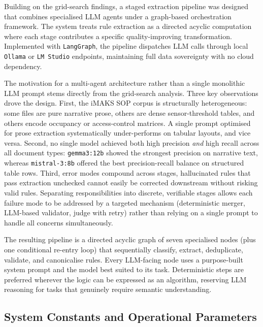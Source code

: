﻿\documentclass[11pt]{article}
\begin{document}
Building on the grid-search findings, a staged extraction pipeline was designed
that combines specialised LLM agents under a graph-based orchestration framework.
The system treats rule extraction as a directed acyclic computation where each
stage contributes a specific quality-improving transformation. Implemented with
\texttt{LangGraph}, the pipeline dispatches LLM calls through local \texttt{Ollama}
or \texttt{LM Studio} endpoints, maintaining full data sovereignty with no cloud
dependency.

The motivation for a multi-agent architecture rather than a single monolithic LLM
prompt stems directly from the grid-search analysis. Three key observations drove the
design.  First, the iMAKS SOP corpus is structurally heterogeneous: some files are
pure narrative prose, others are dense sensor-threshold tables, and others encode
occupancy or access-control matrices. A single prompt optimised for prose extraction
systematically under-performs on tabular layouts, and vice versa.  Second, no single
model achieved both high precision \emph{and} high recall across all document types:
\texttt{gemma3:12b} showed the strongest precision on narrative text, whereas
\texttt{mistral-3:8b} offered the best precision-recall balance on structured
table rows. Third, error modes compound across stages, hallucinated rules that
pass extraction unchecked cannot easily be corrected downstream without risking valid
rules. Separating responsibilities into discrete, verifiable stages allows each
failure mode to be addressed by a targeted mechanism (deterministic merger,
LLM-based validator, judge with retry) rather than relying on a single prompt to
handle all concerns simultaneously.

The resulting pipeline is a directed acyclic graph of seven specialised nodes
(plus one conditional re-entry loop) that sequentially classify, extract, deduplicate,
validate, and canonicalise rules. Every LLM-facing node uses a purpose-built
system prompt and the model best suited to its task. Deterministic steps are
preferred wherever the logic can be expressed as an algorithm, reserving LLM
reasoning for tasks that genuinely require semantic understanding.

\subsection{System Constants and Operational Parameters}
\label{sec:constants}
\end{document}
